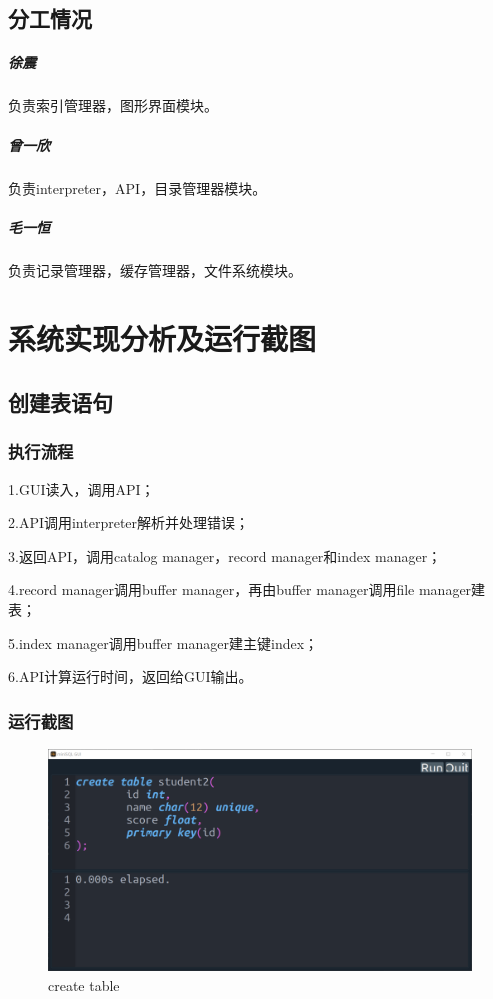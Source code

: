 \documentclass[UTF8]{ctexrep} %
\begin{document}
\section{分工情况}

\paragraph{徐震} 负责索引管理器，图形界面模块。

\paragraph{曾一欣} 负责interpreter，API，目录管理器模块。

\paragraph{毛一恒} 负责记录管理器，缓存管理器，文件系统模块。

\chapter{系统实现分析及运行截图}
\section{创建表语句}
\subsection{执行流程}
1.GUI读入，调用API；
\par
2.API调用interpreter解析并处理错误；
\par
3.返回API，调用catalog manager，record manager和index manager；
\par
4.record manager调用buffer manager，再由buffer manager调用file manager建表；
\par
5.index manager调用buffer manager建主键index；
\par
6.API计算运行时间，返回给GUI输出。
\subsection{运行截图}
\begin{figure}[H]
    \centering
    \includegraphics[width=0.8\linewidth]{figure/1.1.png}
    \caption{create table}
    \label{fig:runtime1.1}
\end{figure}
\end{document}
